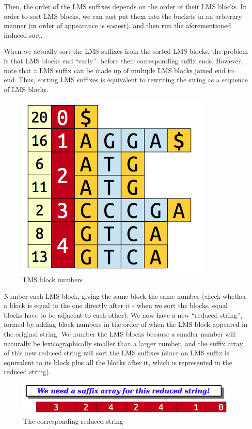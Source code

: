 \documentclass[11pt, oneside]{article}
\begin{document}
Then, the order of the LMS suffixes depends on the order of their LMS blocks.
In order to sort LMS blocks, we can just put them into the buckets in an arbitrary manner (in order of appearance is easiest), and then run the aforementioned induced sort.

When we actually sort the LMS suffixes from the sorted LMS blocks, the problem is that LMS blocks end ``early'': before their corresponding suffix ends. However, note that a LMS suffix can be made up of multiple LMS blocks joined end to end.
Thus, sorting LMS suffixes is equivalent to rewriting the string as a sequence of LMS blocks.

\begin{figure}[h!]
\centering
\includegraphics[scale=0.4]{numbers}
\caption{LMS block numbers}
\end{figure}

Number each LMS block, giving the same block the same number
(check whether a block is equal to the one directly after it - when we sort the blocks, equal blocks have to be adjacent to each other).
We now have a new ``reduced string'', formed by adding block numbers in the order of when the LMS block appeared in the original string.
We number the LMS blocks because a smaller number will naturally be lexicographically smaller than a larger number,
and the suffix array of this new reduced string will sort the LMS suffixes
(since an LMS suffix is equivalent to its block plus all the blocks after it, which is represented in the reduced string).

\begin{figure}[h!]
\centering
\includegraphics[scale=0.3]{reduced}
\caption{The corresponding reduced string}
\end{figure}
\end{document}
